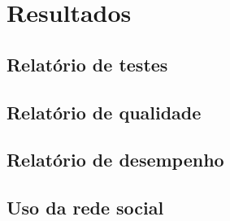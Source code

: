 \chapter{Resultados}
\label{chapter:Resultados}

\section{Relatório de testes}

\section{Relatório de qualidade}

\section{Relatório de desempenho}



\section{Uso da rede social}
